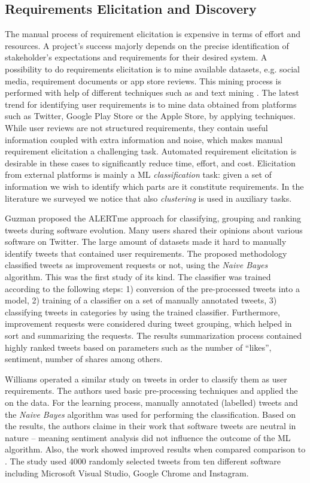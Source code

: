 \subsection{Requirements Elicitation and Discovery}

The manual process of requirement elicitation is expensive in terms of effort
and resources. A project's success majorly depends on the precise identification
of stakeholder's expectations and requirements for their desired system. A
possibility to do requirements elicitation is to mine available datasets, e.g.
social media, requirement documents or  app store reviews. This mining process
is performed with help of different techniques such as \NLP and text mining
\cite{Hollis2017}\cite{dong2010}. The latest trend for identifying
user requirements is to mine data obtained from platforms such as Twitter,
Google Play Store or the Apple Store, by applying \ML techniques. While user
reviews are not structured requirements, they contain useful information
coupled with extra information and noise, which makes manual requirement
elicitation a challenging task. Automated requirement elicitation is desirable
in these cases to significantly reduce time, effort, and cost. Elicitation from
external platforms is mainly a ML \emph{classification} task: given a set of
information we wish to identify which parts are it constitute requirements. In
the literature we surveyed we notice that also \emph{clustering} is used in
auxiliary tasks.

Guzman \etal \cite{Guzman:2017} proposed the ALERTme approach for classifying,
grouping and ranking tweets during software evolution. Many users shared their
opinions about various software on Twitter. The large amount of datasets made it
hard to manually identify tweets that contained user requirements. The proposed
methodology classified tweets as improvement requests or not, using the
\emph{Naive Bayes} algorithm. This was the first study of its kind.
The classifier was trained according to the following steps: 1) conversion of
the pre-processed tweets into a \VSM model, 2) training of a classifier on a set
of manually annotated tweets, 3) classifying tweets in categories by using the
trained classifier. Furthermore, improvement requests were considered during
tweet grouping, which helped in sort and summarizing the requests. The
results summarization process contained highly ranked tweets based on
parameters such as the number of ``likes'', sentiment, number of shares among
others.

Williams \etal \cite{Williams:2017} operated a similar study on tweets in order
to classify them as user requirements. The authors used basic pre-processing
techniques and applied the \VSM on the data. For the learning process, manually
annotated (labelled) tweets and the \emph{Naive Bayes} algorithm was used for
performing the classification. Based on the results, the authors claime in their
work that software tweets are neutral in nature -- meaning sentiment analysis
did not influence the outcome of the ML algorithm. Also, the work showed
improved results when compared comparison to \cite{Guzman:2017}.
The study used 4000 randomly selected tweets from ten different software
including Microsoft Visual Studio, Google Chrome and Instagram.

